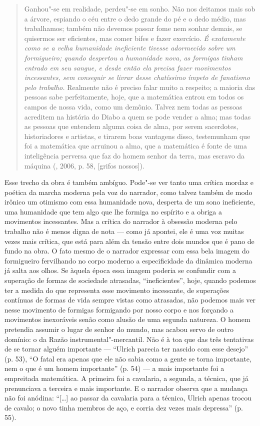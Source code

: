 \begin{quote}
Ganhou"-se em realidade, perdeu"-se em sonho. Não nos deitamos mais sob a
árvore, espiando o céu entre o dedo grande do pé e o dedo médio, mas
trabalhamos; também não devemos passar fome nem sonhar demais, se
quisermos ser eficientes, mas comer bifes e fazer exercício. \emph{É
exatamente como se a velha humanidade ineficiente tivesse adormecido
sobre um formigueiro; quando despertou a humanidade nova, as formigas
tinham entrado em seu sangue, e desde então ela precisa fazer movimentos
incessantes, sem conseguir se livrar desse chatíssimo ímpeto de
fanatismo pelo trabalho.} Realmente não é preciso falar muito a
respeito; a maioria das pessoas sabe perfeitamente, hoje, que a
matemática entrou em todos os campos de nossa vida, como um demônio.
Talvez nem todas as pessoas acreditem na história do Diabo a quem se
pode vender a alma; mas todas as pessoas que entendem alguma coisa de
alma, por serem sacerdotes, historiadores e artistas, e tirarem boas
vantagens disso, testemunham que foi a matemática que arruinou a alma,
que a matemática é fonte de uma inteligência perversa que faz do homem
senhor da terra, mas escravo da máquina (, 2006, p. 58, [grifos nossos]).
\end{quote}

Esse trecho da obra é também ambíguo. Pode"-se ver tanto uma crítica
mordaz e poética da marcha moderna pela voz do narrador, como talvez
também de modo irônico um otimismo com essa humanidade nova, desperta de
um sono ineficiente, uma humanidade que tem algo que lhe formiga no
espírito e a obriga a movimentos incessantes. Mas a crítica do narrador
à obsessão moderna pelo trabalho não é menos digna de nota --- como já
apontei, ele é uma voz muitas vezes mais crítica, que está para além da
tensão entre dois mundos que é pano de fundo na obra. O fato mesmo de o
narrador expressar com essa bela imagem do formigueiro fervilhando no
corpo moderno a especificidade da dinâmica moderna já salta aos olhos.
Se àquela época essa imagem poderia se confundir com a superação de
formas de sociedade atrasadas, ``ineficientes'', hoje, quando podemos
ter a medida do que representa esse movimento incessante, de superações
contínuas de formas de vida sempre vistas como atrasadas, não podemos
mais ver nesse movimento de formigas formigando por nosso corpo e nos
forçando a movimentos inexoráveis senão como alusão de uma segunda
natureza. O homem pretendia assumir o lugar de senhor do mundo, mas
acabou servo de outro domínio: o da Razão instrumental"-mercantil. Não é
à toa que das três tentativas de se tornar alguém importante --- ``Ulrich
parecia ter nascido com esse desejo'' (p. 53), ``O fatal era apenas que
ele não sabia como a gente se torna importante, nem o que é um homem
importante'' (p. 54) --- a mais importante foi a empreitada matemática. A
primeira foi a cavalaria, a segunda, a técnica, que já prenunciava a
terceira e mais importante. E o narrador observa que a mudança não foi
anódina: ``[\ldots{}] ao passar da cavalaria para a técnica, Ulrich
apenas trocou de cavalo; o novo tinha membros de aço, e corria dez vezes
mais depressa'' (p. 55).

